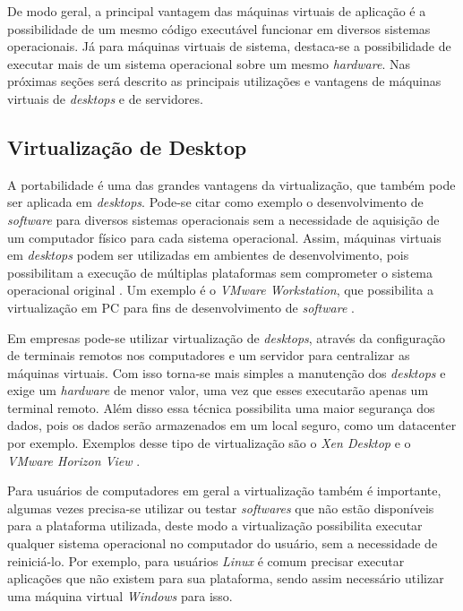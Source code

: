 De modo geral, a principal vantagem das máquinas virtuais de aplicação é a possibilidade de um mesmo código executável funcionar em diversos
sistemas operacionais. Já para máquinas virtuais de sistema, destaca-se a possibilidade de executar mais de um sistema operacional sobre
um mesmo \textit{hardware}. Nas próximas seções será descrito as principais utilizações e vantagens de máquinas virtuais de 
\textit{desktops} e de servidores.

\subsection{Virtualização de Desktop}
\label{section:virtdesk}

A portabilidade é uma das grandes vantagens da virtualização, que também pode ser aplicada em \textit{desktops}. Pode-se citar como exemplo 
o desenvolvimento de \textit{software} para diversos sistemas operacionais sem a necessidade de aquisição de um computador físico para cada 
sistema operacional. Assim, máquinas virtuais em \textit{desktops} podem ser utilizadas em ambientes de desenvolvimento, pois possibilitam 
a execução de múltiplas plataformas sem comprometer o sistema operacional original \cite{carissimi2008}. Um exemplo é o 
\textit{VMware Workstation}, que possibilita a virtualização em \ac{PC} para fins de desenvolvimento de \textit{software} \cite{vmware2016}.

Em empresas pode-se utilizar virtualização de \textit{desktops}, através da configuração de terminais remotos nos computadores e um servidor 
para centralizar as máquinas virtuais. Com isso torna-se mais simples a manutenção dos \textit{desktops} e exige um \textit{hardware} de 
menor valor, uma vez que esses executarão apenas um terminal remoto. Além disso essa técnica possibilita uma maior segurança dos dados, pois
os dados serão armazenados em um local seguro, como um datacenter por exemplo. Exemplos desse tipo de virtualização são o \textit{Xen Desktop}
\cite{xendesktop} e o \textit{VMware Horizon View} \cite{vmwareview}.

Para usuários de computadores em geral a virtualização também é importante, algumas vezes precisa-se utilizar ou testar \textit{softwares}
que não estão disponíveis para a plataforma utilizada, deste modo a virtualização possibilita executar qualquer sistema operacional no computador
do usuário, sem a necessidade de reiniciá-lo. Por exemplo, para usuários \textit{Linux} é comum precisar executar aplicações que não existem 
para sua plataforma, sendo assim necessário utilizar uma máquina virtual \textit{Windows} para isso.

